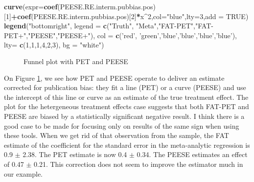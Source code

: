 \documentclass[]{book}
\newenvironment{Shaded}{\begin{snugshade}}{\end{snugshade}}
\newcommand{\DataTypeTok}[1]{\textcolor[rgb]{0.13,0.29,0.53}{#1}}
\newcommand{\DecValTok}[1]{\textcolor[rgb]{0.00,0.00,0.81}{#1}}
\newcommand{\KeywordTok}[1]{\textcolor[rgb]{0.13,0.29,0.53}{\textbf{#1}}}
\newcommand{\NormalTok}[1]{#1}
\newcommand{\OperatorTok}[1]{\textcolor[rgb]{0.81,0.36,0.00}{\textbf{#1}}}
\newcommand{\OtherTok}[1]{\textcolor[rgb]{0.56,0.35,0.01}{#1}}
\newcommand{\StringTok}[1]{\textcolor[rgb]{0.31,0.60,0.02}{#1}}
\theoremstyle{definition}
\theoremstyle{definition}
\theoremstyle{definition}
\theoremstyle{remark}
\begin{document}
\begin{Shaded}
\begin{Highlighting}[]
\KeywordTok{curve}\NormalTok{(}\DataTypeTok{expr=}\KeywordTok{coef}\NormalTok{(PEESE.RE.interm.pubbias.pos)[}\DecValTok{1}\NormalTok{]}\OperatorTok{+}\KeywordTok{coef}\NormalTok{(PEESE.RE.interm.pubbias.pos)[}\DecValTok{2}\NormalTok{]}\OperatorTok{*}\NormalTok{x}\OperatorTok{^}\DecValTok{2}\NormalTok{,}\DataTypeTok{col=}\StringTok{"blue"}\NormalTok{,}\DataTypeTok{lty=}\DecValTok{3}\NormalTok{,}\DataTypeTok{add =} \OtherTok{TRUE}\NormalTok{)}
\KeywordTok{legend}\NormalTok{(}\StringTok{"bottomright"}\NormalTok{,}
       \DataTypeTok{legend =} \KeywordTok{c}\NormalTok{(}\StringTok{"Truth"}\NormalTok{, }\StringTok{"Meta"}\NormalTok{,}\StringTok{"FAT-PET"}\NormalTok{,}\StringTok{"FAT-PET+"}\NormalTok{,}\StringTok{"PEESE"}\NormalTok{,}\StringTok{"PEESE+"}\NormalTok{),}
       \DataTypeTok{col =} \KeywordTok{c}\NormalTok{(}\StringTok{'red'}\NormalTok{, }\StringTok{'green'}\NormalTok{,}\StringTok{'blue'}\NormalTok{,}\StringTok{'blue'}\NormalTok{,}\StringTok{'blue'}\NormalTok{,}\StringTok{'blue'}\NormalTok{),}
       \DataTypeTok{lty=} \KeywordTok{c}\NormalTok{(}\DecValTok{1}\NormalTok{,}\DecValTok{1}\NormalTok{,}\DecValTok{1}\NormalTok{,}\DecValTok{4}\NormalTok{,}\DecValTok{2}\NormalTok{,}\DecValTok{3}\NormalTok{),}
       \DataTypeTok{bg =} \StringTok{"white"}\NormalTok{)}
\end{Highlighting}
\end{Shaded}

\begin{figure}[htbp]

{\centering {}

}

\caption{Funnel plot with PET and PEESE}\label{fig:FunnelPlotREPETPEESE}
\end{figure}

On Figure \ref{fig:FunnelPlotREPETPEESE}, we see how PET and PEESE operate to deliver an estimate corrected for publication bias: they fit a line (PET) or a curve (PEESE) and use the intercept of this line or curve as an estimate of the true treatment effect.
The plot for the hetergeneous treatment effects case suggests that both FAT-PET and PEESE are biased by a statistically significant negative result.
I think there is a good case to be made for focusing only on results of the same sign when using these tools.
When we get rid of that observation from the sample, the FAT estimate of the coefficient for the standard error in the meta-analytic regression is 0.9 \(\pm\) 2.38.
The PET estimate is now 0.4 \(\pm\) 0.34.
The PEESE estimates an effect of 0.47 \(\pm\) 0.21.
This correction does not seem to improve the estimator much in our example.
\end{document}
